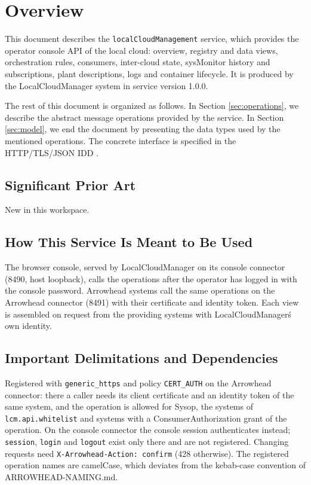 \documentclass[a4paper]{arrowhead}
\begin{document}
\section{Overview}
\label{sec:overview}

This document describes the \texttt{local\allowbreak{}Cloud\allowbreak{}Management} service, which provides the operator console API of the local cloud: overview, registry and data views, orchestration rules, consumers, inter-cloud state, sysMonitor history and subscriptions, plant descriptions, logs and container lifecycle.
It is produced by the LocalCloudManager system \cite{lcm-sysd} in service version 1.0.0.

The rest of this document is organized as follows.
In Section \ref{sec:operations}, we describe the abstract message operations provided by the service.
In Section \ref{sec:model}, we end the document by presenting the data types used by the mentioned operations.
The concrete interface is specified in the HTTP/TLS/JSON IDD \cite{lcm-localCloudManagement-http-idd}.

\subsection{Significant Prior Art}

New in this workspace.

\subsection{How This Service Is Meant to Be Used}

The browser console, served by LocalCloudManager on its console connector (8490, host loopback), calls the operations after the operator has logged in with the console password. Arrowhead systems call the same operations on the Arrowhead connector (8491) with their certificate and identity token. Each view is assembled on request from the providing systems with LocalCloudManager\'s own identity.

\subsection{Important Delimitations and Dependencies}
\label{sec:delimitations}

Registered with \texttt{generic\_\allowbreak{}https} and policy \texttt{CERT\_\allowbreak{}AUTH} on the Arrowhead connector: there a caller needs its client certificate and an identity token of the same system, and the operation is allowed for Sysop, the systems of \texttt{lcm.\allowbreak{}api.\allowbreak{}whitelist} and systems with a ConsumerAuthorization grant of the operation. On the console connector the console session authenticates instead; \texttt{session}, \texttt{login} and \texttt{logout} exist only there and are not registered. Changing requests need \texttt{X-\allowbreak{}Arrowhead-\allowbreak{}Action:\allowbreak{} confirm} (428 otherwise). The registered operation names are camelCase, which deviates from the kebab-case convention of ARROWHEAD-NAMING.md.
\end{document}
